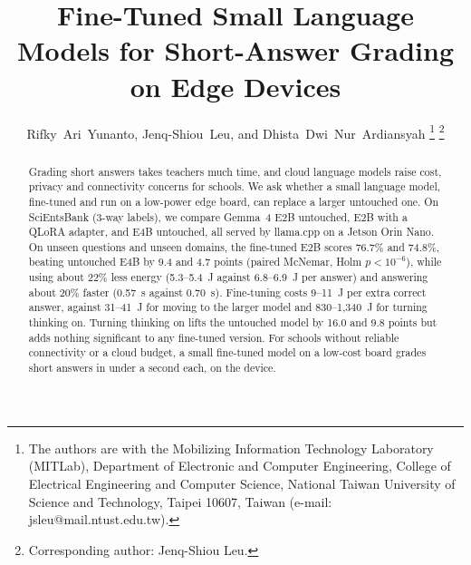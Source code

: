\documentclass[journal]{IEEEtran}
\begin{document}
\title{Fine-Tuned Small Language Models for Short-Answer Grading on Edge Devices}

\author{Rifky~Ari~Yunanto, Jenq-Shiou~Leu, and Dhista~Dwi~Nur~Ardiansyah
\thanks{The authors are with the Mobilizing Information Technology Laboratory (MITLab), Department of Electronic and Computer Engineering, College of Electrical Engineering and Computer Science, National Taiwan University of Science and Technology, Taipei 10607, Taiwan (e-mail: jsleu@mail.ntust.edu.tw).}
\thanks{Corresponding author: Jenq-Shiou Leu.}}


\maketitle

\begin{abstract}
Grading short answers takes teachers much time, and cloud language models raise cost, privacy and connectivity concerns for schools.
We ask whether a small language model, fine-tuned and run on a low-power edge board, can replace a larger untouched one.
On SciEntsBank (3-way labels), we compare Gemma~4 E2B untouched, E2B with a QLoRA adapter, and E4B untouched, all served by llama.cpp on a Jetson Orin Nano.
On unseen questions and unseen domains, the fine-tuned E2B scores 76.7\% and 74.8\%, beating untouched E4B by 9.4 and 4.7 points (paired McNemar, Holm $p<10^{-6}$),
while using about 22\% less energy (5.3--5.4~J against 6.8--6.9~J per answer) and answering about 20\% faster (0.57~s against 0.70~s).
Fine-tuning costs 9--11~J per extra correct answer, against 31--41~J for moving to the larger model and 830--1{,}340~J for turning thinking on.
Turning thinking on lifts the untouched model by 16.0 and 9.8 points but adds nothing significant to any fine-tuned version.
For schools without reliable connectivity or a cloud budget, a small fine-tuned model on a low-cost board grades short answers in under a second each, on the device.
\end{abstract}
\end{document}
